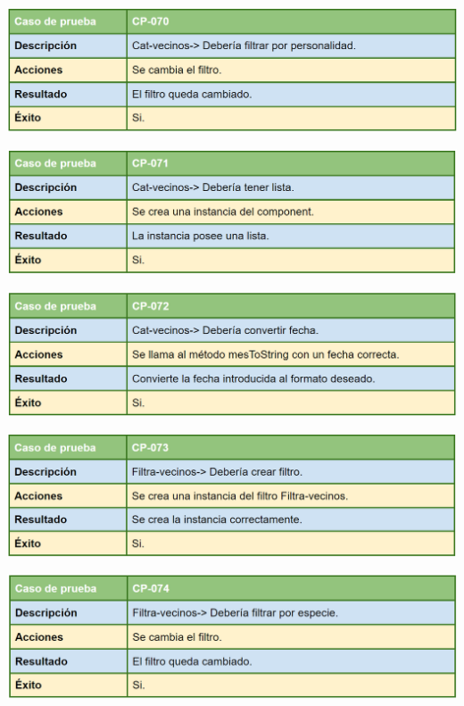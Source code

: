 \bigskip

\includegraphics[width=\textwidth]{img/cap7/cp-070.png}

\bigskip

\includegraphics[width=\textwidth]{img/cap7/cp-071.png}

\bigskip

\includegraphics[width=\textwidth]{img/cap7/cp-072.png}

\bigskip

\includegraphics[width=\textwidth]{img/cap7/cp-073.png}

\bigskip

\includegraphics[width=\textwidth]{img/cap7/cp-074.png}

